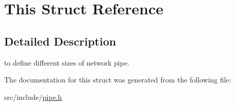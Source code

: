 \hypertarget{struct_this}{}\section{This Struct Reference}
\label{struct_this}


\subsection{Detailed Description}
to define different sizes of network pipe. 

The documentation for this struct was generated from the following file\+:\begin{DoxyCompactItemize}
\item 
src/include/\hyperlink{pipe_8h}{pipe.\+h}\end{DoxyCompactItemize}
